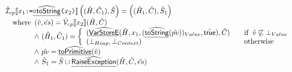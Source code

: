 \documentclass{article}
\newcommand{\SF}[1]{\mbox{\textsf{#1}}}
\newcommand{\TT}[1]{\mbox{\texttt{#1}}}
\newcommand{\wherec}[1]{{\rm where}\begin{array}[t]{l}#1\end{array}}
\newcommand{\ifc}[1]{{\rm if}\begin{array}[t]{l}#1\end{array}}
\newcommand{\owc}{{\rm otherwise}}
\newcommand{\aI}{\hat{\mathcal{I}}}
\newcommand{\aV}{\hat{\mathcal{V}}}
\newcommand{\lbr}{\llbracket}
\newcommand{\rbr}{\rrbracket}
\newcommand{\ahf}[1]{\widehat{\underline{\sf #1}}}
\newcommand{\ahfi}[1]{\ahf{\ensuremath{\diamond}#1}}
\newcommand{\atrue}{\hat{\SF{true}}}
\begin{document}
\[\begin{array}{ll}
\aI_{cp}\lbr x_1 \TT{:=} \ahfi{toString}\TT{(}x_2\TT{)} \rbr \left((\hat{H},\hat{C}_1),\hat{S}\right)
= \left((\hat{H}_1,\hat{C}),\hat{S}_1\right)
\\\quad\wherec{
  (\hat{v},\hat{es}) = \aV_{cp}\lbr x_2\rbr(\hat{H},\hat{C})\\
  \land\ (\hat{H}_1, \hat{C}_1) = \left\{
     \begin{array}{ll}
       (\ahf{VarStoreE}(\hat{H},x_1,(\ahf{toString}(\hat{pv}))_{Value},\atrue), \hat{C})
       & \quad\ifc{\hat{v}\not\sqsubseteq\bot_{Value}} \\
       (\bot_{Heap}, \bot_{Context}) & \quad\owc
     \end{array}\right.\\
  \land\ \hat{pv}=\ahf{toPrimitive}(\hat{v})\\
  \land\ \hat{S}_1 = \hat{S}\sqcup\ahf{RaiseException}(\hat{H},\hat{C}, \hat{es})
}\\
\\
\end{array}
\]
\end{document}
